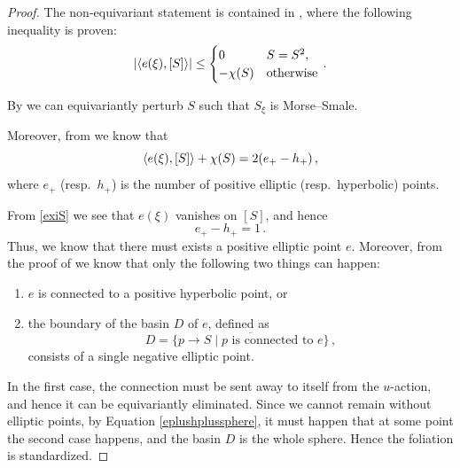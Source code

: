 \documentclass[a4paper, 11pt]{amsart}
\theoremstyle{plain}
\theoremstyle{definition}
\DeclarePairedDelimiter{\ang}{\langle}{\rangle}
\DeclarePairedDelimiter{\abs}{\lvert}{\rvert}
\begin{document}
\begin{proof}
	The non-equivariant statement is contained in \cite[Thm.\ 4.6.30]{geigesIntroductionContactTopology2008}, where the following inequality is proven:
	\begin{equation}\label{exiS}
		\abs{\ang{e(\xi), [S]}} \le 
		\begin{cases}
		0 & S = S^2,\\
		-\chi(S) & \text{otherwise}
		\end{cases}\,.
	\end{equation}
	
	By  we can equivariantly perturb $S$ such that $S_\xi$ is Morse--Smale. 
	
	Moreover, from \cite[Prop.\ 4.6.14]{geigesIntroductionContactTopology2008} we know that
	\[
		\ang{e(\xi), [S]} + \chi(S) = 2(e_+ - h_+)\,,
	\]
	where $e_+$ (resp.\ $h_+$) is the number of positive elliptic (resp.\ hyperbolic) points.
	
	From \eqref{exiS} we see that $e(\xi)$ vanishes on $[S]$, and hence
	\begin{equation}\label{eplushplussphere}
		e_+ - h_+ = 1\,.
	\end{equation}
	Thus, we know that there must exists a positive elliptic point $e$. Moreover, from the proof of \cite[Thm.\ 4.6.30]{geigesIntroductionContactTopology2008} we know that only the following two things can happen:
	\begin{enumerate}
		\item $e$ is connected to a positive hyperbolic point, or
		\item the boundary of the basin $D$ of $e$, defined as
		\[
			D = \overline{\{p \to S \mid p \text{ is connected to $e$}\}}\,,
		\]
		consists of a single negative elliptic point.
	\end{enumerate}
	In the first case, the connection must be sent away to itself from the $u$-action, and hence it can be equivariantly eliminated. Since we cannot remain without elliptic points, by Equation \eqref{eplushplussphere}, it must happen that at some point the second case happens, and the basin $D$ is the whole sphere. Hence the foliation is standardized.
\end{proof}
\end{document}
